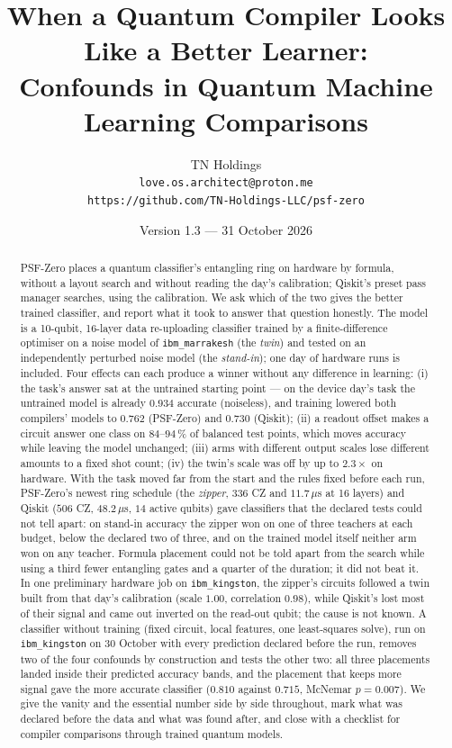 \documentclass[11pt]{article}
\title{When a Quantum Compiler Looks Like a Better Learner:\\
Confounds in Quantum Machine Learning Comparisons}
\author{TN Holdings\\
\texttt{love.os.architect@proton.me}\\
\texttt{https://github.com/TN-Holdings-LLC/psf-zero}}
\date{Version 1.3 --- 31 October 2026}
\begin{document}
\maketitle

\begin{abstract}
PSF-Zero places a quantum classifier's entangling ring on hardware by formula, without a layout search and without
reading the day's calibration; Qiskit's preset pass manager searches, using the calibration. We ask which of the two
gives the better trained classifier, and report what it took to answer that question honestly. The model is a
10-qubit, 16-layer data re-uploading classifier trained by a finite-difference optimiser on a noise model of
\texttt{ibm\_marrakesh} (the \emph{twin}) and tested on an independently perturbed noise model (the \emph{stand-in});
one day of hardware runs is included. Four effects can each produce a winner without any difference in learning:
(i) the task's answer sat at the untrained starting point --- on the device day's task the untrained model is already
$0.934$ accurate (noiseless), and training lowered both compilers' models to $0.762$ (PSF-Zero) and $0.730$ (Qiskit);
(ii) a readout offset makes a circuit answer one class on $84$--$94\,\%$ of balanced test points, which moves accuracy
while leaving the model unchanged; (iii) arms with different output scales lose different amounts to a fixed shot
count; (iv) the twin's scale was off by up to $2.3\times$ on hardware. With the task moved far from the start and the
rules fixed before each run, PSF-Zero's newest ring schedule (the \emph{zipper}, $336$ CZ and $11.7\,\mu$s at 16
layers) and Qiskit ($506$ CZ, $48.2\,\mu$s, $14$ active qubits) gave classifiers that the declared tests could not tell
apart: on stand-in accuracy the zipper won on one of three teachers at each budget, below the declared two of
three, and on the trained model itself neither arm won on any teacher. Formula placement could not be told apart from the search while using a third fewer entangling gates and a
quarter of the duration; it did not beat it. In one preliminary hardware job on \texttt{ibm\_kingston}, the zipper's
circuits followed a twin built from that day's calibration (scale $1.00$, correlation $0.98$), while Qiskit's lost most
of their signal and came out inverted on the read-out qubit; the cause is not known. A classifier without training
(fixed circuit, local features, one least-squares solve), run on \texttt{ibm\_kingston} on 30 October with every
prediction declared before the run, removes two of the four confounds by construction and tests the other two: all
three placements landed inside their predicted accuracy bands, and the placement that keeps more signal gave the
more accurate classifier ($0.810$ against $0.715$, McNemar $p = 0.007$). We give the vanity and the essential number side by side throughout, mark what was
declared before the data and what was found after, and close with a checklist for compiler comparisons through
trained quantum models.
\end{abstract}
\end{document}
